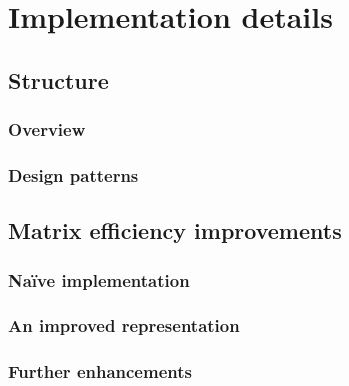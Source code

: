 \chapter{Implementation details}
\label{ch:implementation}

\section{Structure}

\subsection{Overview}

\subsection{Design patterns}

\section{Matrix efficiency improvements}

\subsection{Na\"{i}ve implementation}

\subsection{An improved representation}

\subsection{Further enhancements}
